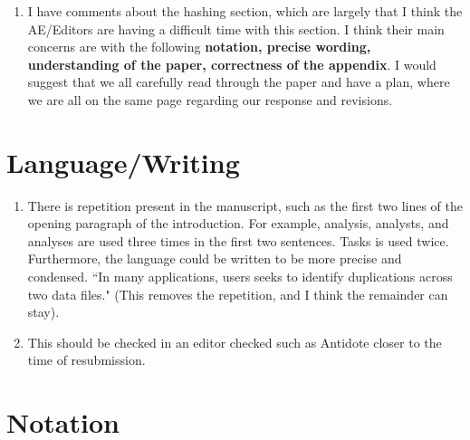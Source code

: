 \documentclass{article}
\begin{document}
\begin{enumerate}
\begin{quote}
\end{quote}

\item I have comments about the hashing section, which are largely that I think the AE/Editors are having a difficult time with this section. I think their main concerns are with the following \textbf{notation, precise wording, understanding of the paper, correctness of the appendix}. I would suggest that we all carefully read through the paper and have a plan, where we are all on the same page regarding our response and revisions. 

\end{enumerate}

\section{Language/Writing}
\begin{enumerate}
\item There is repetition present in the manuscript, such as the first two lines of the opening paragraph of the introduction. For example, analysis, analysts, and analyses are used three times in the first two sentences. Tasks is used twice. Furthermore, the language could be written to be more precise and condensed. ``In many applications, users seeks to identify duplications across two data files." (This removes the repetition, and I think the remainder can stay). 
\item This should be checked in an editor checked such as Antidote closer to the time of resubmission. 
\end{enumerate}

\section{Notation}
\end{document}
